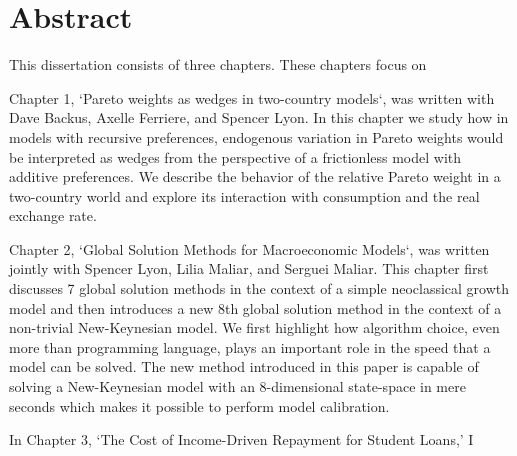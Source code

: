 \documentclass[12pt,letterpaper,oneside,final]{memoir}
\begin{document}
\newpage

\chapter{Abstract}

  \DoubleSpacing

  This dissertation consists of three chapters. These chapters focus on

  Chapter 1, `Pareto weights as wedges in two-country models`, was written with Dave Backus, Axelle
  Ferriere, and Spencer Lyon. In this chapter we study how in models with recursive preferences,
  endogenous variation in Pareto weights would be interpreted as wedges from the perspective of a
  frictionless model with additive preferences. We describe the behavior of the relative Pareto
  weight in a two-country world and explore its interaction with consumption and the real exchange
  rate.

  Chapter 2, `Global Solution Methods for Macroeconomic Models`, was written jointly with Spencer
  Lyon, Lilia Maliar, and Serguei Maliar. This chapter first discusses 7 global solution methods in
  the context of a simple neoclassical growth model and then introduces a new 8th global solution
  method in the context of a non-trivial New-Keynesian model. We first highlight how algorithm
  choice, even more than programming language, plays an important role in the speed that a model can
  be solved. The new method introduced in this paper is capable of solving a New-Keynesian model
  with an 8-dimensional state-space in mere seconds which makes it possible to perform model
  calibration.

  In Chapter 3, `The Cost of Income-Driven Repayment for Student Loans,' I

\newpage


  \renewcommand*{\cftappendixname}{Appendix\space}
  \renewcommand*{\contentsname}{Table of Contents}
  \setcounter{tocdepth}{1}%
  \begin{KeepFromToc}
  \tableofcontents*
  \end{KeepFromToc}

\clearpage
\newpage
\clearpage


  \listoffigures
\end{document}
